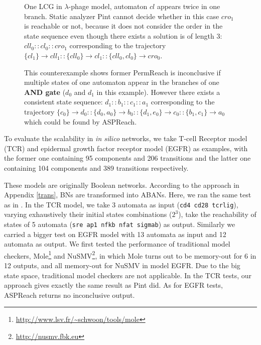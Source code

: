\documentclass{entcs}
\newcommand{\acm}[3]{\{#1\}\rightarrow#2}
\begin{document}
\begin{figure}[ht]
\centering
    
    \caption{One LCG in $\lambda$-phage model, automaton $cl$ appears twice in one branch. Static analyzer Pint cannot decide whether in this case $cro_1$ is reachable or not, because it does not consider the order in the state sequence even though there exists a solution is of length 3: $cll_0::cl_0::cro_1$ corresponding to the trajectory $\acm{cl_1}{cll_1}{cll_0}::\acm{cll_0}{cl_1}{cl_0}::\acm{cll_0,cl_0}{cro_0}{cro_1}$.}
    \label{fig:LCG_lambdaPhage}
\end{figure}
\begin{figure}[ht]
    \centering
    
    \caption{This counterexample shows former PermReach is inconclusive if multiple states of one automaton appear in the branches of one \textbf{AND gate} ($d_0$ and $d_1$ in this example). 
    However there exists a consistent state sequence: $d_1::b_1::c_1::a_1$ corresponding to the trajectory $\acm{c_0}{d_0}{d_1}::\acm{d_0,a_0}{b_0}{b_1}::\acm{d_1,e_0}{c_0}{c_1}::\acm{b_1,c_1}{a_0}{a_1}$ which could be found by ASPReach.}\label{fig:countexPerm}
\end{figure}

To evaluate the scalability in \textit{in silico} networks, we take T-cell Receptor model (TCR) \cite{saez2007logical} and epidermal growth factor receptor model (EGFR) \cite{samaga2009logic} as examples, with the former one containing 95 components and 206 transitions and the latter one containing 104 components and 389 transitions respectively. 

These models are originally Boolean networks.
According to the approach in Appendix \ref{trans}, BNs are transformed into ABANs. 
Here, we ran the same test as in \cite{folschette2015}. In the TCR model, we take 3 automata as input (\texttt{cd4 cd28 tcrlig}), varying exhaustively their initial states combinations ($2^3$), take the reachability of states of 5 automata (\texttt{sre ap1 nfkb nfat sigmab}) as output. 
Similarly we carried a bigger test on EGFR model with 13 automata %
as input and 12 automata %
as output.
We first tested the performance of traditional model checkers, Mole\footnote{\url{http://www.lsv.fr/~schwoon/tools/mole}} and NuSMV\footnote{\url{http://nusmv.fbk.eu}}, in which Mole turns out to be memory-out for 6 in 12 outputs, and all memory-out for NuSMV in model EGFR. 
Due to the big state space, traditional model checkers are not applicable.
In the TCR tests, our approach gives exactly the same result as Pint did. 
As for EGFR tests, ASPReach returns no inconclusive output.
\end{document}

